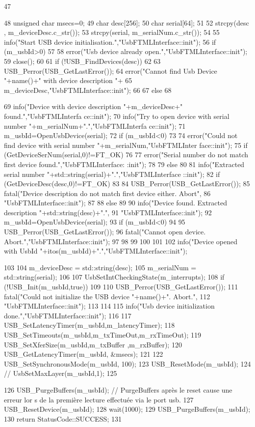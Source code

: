 \begin{DoxyCode}
47                                     {
48   unsigned char msecs=0;
49   char desc[256];
50   char serial[64];      
51 
52   strcpy(desc  , m_deviceDesc.c_str());
53   strcpy(serial, m_serialNum.c_str());  
54 
55   info("Start USB device initialisation.","UsbFTMLInterface::init");
56   if (m_usbId>0)
57   {
58     error("Usb device already open.","UsbFTMLInterface::init");    
59     close();
60   }
61   if (!USB_FindDevices(desc))
62   {
63     USB_Perror(USB_GetLastError());
64     error("Cannot find Usb Device "+name()+" with device description "+
65           m_deviceDesc,"UsbFTMLInterface::init");
66   }
67   else
68     {  
69     info("Device with device description "+m_deviceDesc+" found.","UsbFTMLInterfa
      ce::init");
70     info("Try to open device with serial number "+m_serialNum+".","UsbFTMLInterfa
      ce::init");
71     m_usbId=OpenUsbDevice(serial);
72     if (m_usbId<0)
73     {
74       error("Could not find device with serial number "+m_serialNum,"UsbFTMLInter
      face::init");
75       if (GetDeviceSerNum(serial,0)!=FT_OK)
76       {
77         error("Serial number do not match first device found.","UsbFTMLInterface:
      :init");
78       }
79       else
80       {
81         info("Extracted serial number "+std::string(serial)+".","UsbFTMLInterface
      ::init");
82         if (GetDeviceDesc(desc,0)!=FT_OK)
83         {
84           USB_Perror(USB_GetLastError());  
85           fatal("Device description do not match first device either. Abort",
86                 "UsbFTMLInterface::init");
87         }
88         else
89         {
90           info("Device found. Extracted description "+std::string(desc)+".",
91                "UsbFTMLInterface::init");
92           m_usbId=OpenUsbDevice(serial);
93           if (m_usbId<0)
94           {
95             USB_Perror(USB_GetLastError());  
96             fatal("Cannot open device. Abort.","UsbFTMLInterface::init"); 
97           }          
98         }
99       }
100     }
101     
102     info("Device opened with UsbId "+itos(m_usbId)+".","UsbFTMLInterface::init");
      
103 
104     m_deviceDesc = std::string(desc);
105     m_serialNum  = std::string(serial);
106     
107     UsbSetIntCheckingState(m_interrupts);
108     if (!USB_Init(m_usbId,true))
109     {
110       USB_Perror(USB_GetLastError());  
111       fatal("Could not initialize the USB device "+name()+". Abort.",
112             "UsbFTMLInterface::init");
113     }
114 
115     info("Usb device initialization done.","UsbFTMLInterface::init");
116 
117     USB_SetLatencyTimer(m_usbId,m_latencyTimer);
118     USB_SetTimeouts(m_usbId,m_txTimeOut,m_rxTimeOut);
119     USB_SetXferSize(m_usbId,m_txBuffer ,m_rxBuffer);
120     USB_GetLatencyTimer(m_usbId, &msecs);
121 
122     USB_SetSynchronousMode(m_usbId, 100);
123     USB_ResetMode(m_usbId);
124     //   UsbSetMaxLayer(m_usbId,1);
125   }
126   USB_PurgeBuffers(m_usbId); // PurgeBuffers après le reset cause une erreur lor
      s de la première lecture effectuée via le port usb.
127   USB_ResetDevice(m_usbId);
128   wait(1000);
129   USB_PurgeBuffers(m_usbId); 
130   return StatusCode::SUCCESS;
131 }
\end{DoxyCode}
